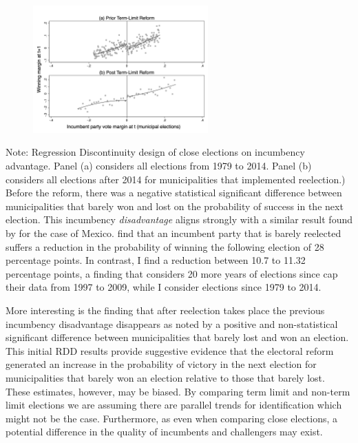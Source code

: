 \documentclass[12pt]{amsart}
\numberwithin{equation}{section}
\theoremstyle{definition}
\theoremstyle{definition}
\theoremstyle{definition}
\begin{document}
\begin{appendix}
\begin{figure}[H]
 \includegraphics[width=0.6\textwidth]{../Figures_incumbency/RDD_incumbency_margin_pol2.png}
     \captionsetup{justification=centering}  
       
\end{figure} 
       Note: Regression Discontinuity design of close elections on incumbency advantage. Panel (a) considers all elections from 1979 to 2014. Panel (b) considers all elections after 2014 for municipalities that implemented reelection.) 
\\
       
Before the reform, there was a negative statistical significant difference between municipalities that barely won and lost on the probability of success in the next election. This incumbency \emph{disadvantage} aligns strongly with a similar result found by \citet{klasnja_titiunik_2017} for the case of Mexico. \citet{klasnja_titiunik_2017} find that an incumbent party that is barely reelected suffers a reduction in the probability of winning the following election of 28 percentage points. In contrast, I find a reduction between 10.7 to 11.32 percentage points, a finding that considers 20 more years of elections since \citet{klasnja_titiunik_2017} cap their data from 1997 to 2009, while I consider elections since 1979 to 2014. 

More interesting is the finding that after reelection takes place the previous incumbency disadvantage disappears as noted by a positive and non-statistical significant difference between municipalities that barely lost and won an election. This initial RDD results provide suggestive evidence that the electoral reform generated an increase in the probability of victory in the next election for municipalities that barely won an election relative to those that barely lost. These estimates, however, may be biased. By comparing term limit and non-term limit elections we are assuming there are parallel trends for identification which might not be the case. Furthermore, as \citet{eggers_2017} even when comparing close elections, a potential difference in the quality of incumbents and challengers may exist. 
 

\end{appendix}
\end{document}
